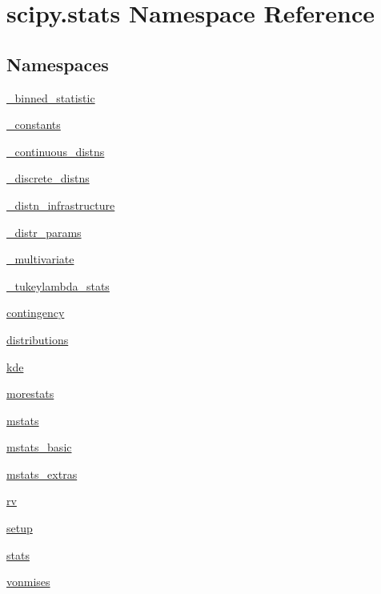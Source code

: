 \hypertarget{namespacescipy_1_1stats}{}\section{scipy.\+stats Namespace Reference}
\label{namespacescipy_1_1stats}
\subsection*{Namespaces}
\begin{DoxyCompactItemize}
\item 
 \hyperlink{namespacescipy_1_1stats_1_1__binned__statistic}{\+\_\+binned\+\_\+statistic}
\item 
 \hyperlink{namespacescipy_1_1stats_1_1__constants}{\+\_\+constants}
\item 
 \hyperlink{namespacescipy_1_1stats_1_1__continuous__distns}{\+\_\+continuous\+\_\+distns}
\item 
 \hyperlink{namespacescipy_1_1stats_1_1__discrete__distns}{\+\_\+discrete\+\_\+distns}
\item 
 \hyperlink{namespacescipy_1_1stats_1_1__distn__infrastructure}{\+\_\+distn\+\_\+infrastructure}
\item 
 \hyperlink{namespacescipy_1_1stats_1_1__distr__params}{\+\_\+distr\+\_\+params}
\item 
 \hyperlink{namespacescipy_1_1stats_1_1__multivariate}{\+\_\+multivariate}
\item 
 \hyperlink{namespacescipy_1_1stats_1_1__tukeylambda__stats}{\+\_\+tukeylambda\+\_\+stats}
\item 
 \hyperlink{namespacescipy_1_1stats_1_1contingency}{contingency}
\item 
 \hyperlink{namespacescipy_1_1stats_1_1distributions}{distributions}
\item 
 \hyperlink{namespacescipy_1_1stats_1_1kde}{kde}
\item 
 \hyperlink{namespacescipy_1_1stats_1_1morestats}{morestats}
\item 
 \hyperlink{namespacescipy_1_1stats_1_1mstats}{mstats}
\item 
 \hyperlink{namespacescipy_1_1stats_1_1mstats__basic}{mstats\+\_\+basic}
\item 
 \hyperlink{namespacescipy_1_1stats_1_1mstats__extras}{mstats\+\_\+extras}
\item 
 \hyperlink{namespacescipy_1_1stats_1_1rv}{rv}
\item 
 \hyperlink{namespacescipy_1_1stats_1_1setup}{setup}
\item 
 \hyperlink{namespacescipy_1_1stats_1_1stats}{stats}
\item 
 \hyperlink{namespacescipy_1_1stats_1_1vonmises}{vonmises}
\end{DoxyCompactItemize}
